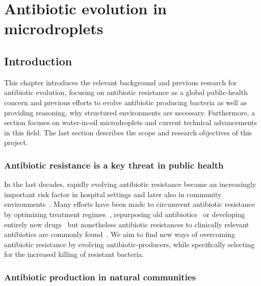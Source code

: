 \part{Antibiotic evolution in microdroplets}
\chapter{Introduction}
\label{chap:droplets_intro}

This chapter introduces the relevant background and previous research for antibiotic evolution, focusing on antibiotic resistance as a global public-health concern and previous efforts to evolve antibiotic producing bacteria as well as providing reasoning, why structured environments are necessary. Furthermore, a section focuses on water-in-oil microdroplets and current technical advancements in this field. The last section describes the scope and research objectives of this project.

\section{Antibiotic resistance is a key threat in public health}

In the last decades, rapidly evolving antibiotic resistance became an increasingly important risk factor in hospital settings and later also in community environments~\cite{David2010-az}. Many efforts have been made to circumvent antibiotic resistance by optimizing treatment regimes~\cite{Kim2014-lq}, repurposing old antibiotics~\cite{Kim2019-qk} or developing entirely new drugs~\cite{Lin2017} but nonetheless antibiotic resistances to clinically relevant antibiotics are commonly found~\cite{Jernigan2020-ro}. We aim to find new ways of overcoming antibiotic resistance by evolving antibiotic-producers, while specifically selecting for the increased killing of resistant bacteria.

\section{Antibiotic production in natural communities}
\label{sec:natural_production}

